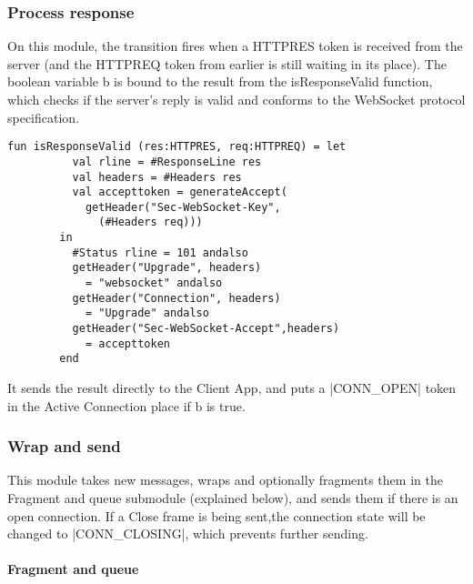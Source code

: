 		
		
	\subsubsection{Process response}
		
		
		On this module, the transition fires when a HTTPRES token is received from the
		server (and the HTTPREQ token from earlier is still waiting in its place). The
		boolean variable b is bound to the result from the isResponseValid function,
		which checks if the server's reply is valid and conforms to the WebSocket
		protocol specification.
		
		\begin{lstlisting}[label=lst:isResponseValid,caption=isResponseValid,gobble=2]
		fun isResponseValid (res:HTTPRES, req:HTTPREQ) = let
		  val rline = #ResponseLine res
		  val headers = #Headers res
		  val accepttoken = generateAccept(
		    getHeader("Sec-WebSocket-Key",
		      (#Headers req)))
		in
		  #Status rline = 101 andalso
		  getHeader("Upgrade", headers) 
		    = "websocket" andalso
		  getHeader("Connection", headers) 
		    = "Upgrade" andalso
		  getHeader("Sec-WebSocket-Accept",headers)
		    = accepttoken
		end
		\end{lstlisting}
		
		It sends the result directly to the Client App, and puts a |CONN_OPEN| token
		in the Active Connection place if b is true.
		
	\subsubsection{Wrap and send}
		
		
		This module takes new messages, wraps and optionally fragments them in the
		Fragment and queue submodule (explained below), and sends them if there is
		an open connection. If a Close frame is being sent,the
		connection state will be changed to |CONN_CLOSING|, which prevents
		further sending.
		
		\paragraph{Fragment and queue}
			
			
